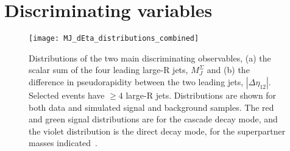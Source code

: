 \section{Discriminating variables}\label{sec:variables}
\begin{figure}[!ht]
    \centering
    \texttt{[image: MJ\_dEta\_distributions\_combined]}
    \caption{Distributions of the two main discriminating observables, (a) the scalar sum of the four leading large-R jets, $M_{J}^{\Sigma}$ and (b) the difference in pseudorapidity between the two leading jets, $|\Delta\eta_{12}|$.
    Selected events have $\geq 4$ large-R jets.
    Distributions are shown for both data and simulated signal and background samples.
    The red and green signal distributions are for the cascade decay mode, and the violet distribution is the direct decay mode, for the superpartner masses indicated~\cite{paper-plb}.}
    \label{fig:MJ_dEta_distributions}
\end{figure}




